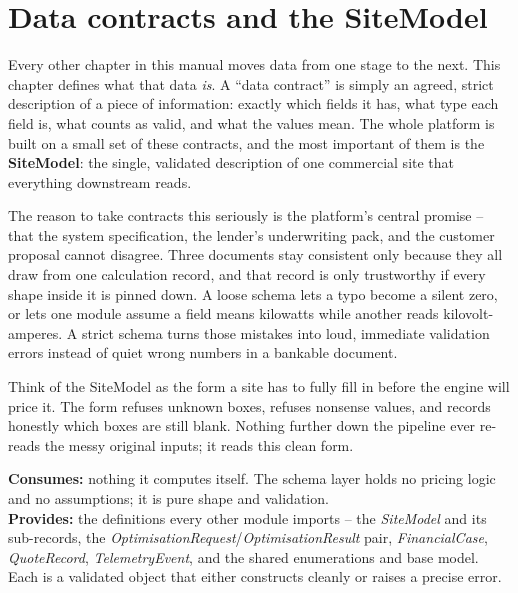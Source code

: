 \chapter{Data contracts and the SiteModel}
\label{ch:contracts}


Every other chapter in this manual moves data from one stage to the next. This chapter defines what that data \emph{is}. A ``data contract'' is simply an agreed, strict description of a piece of information: exactly which fields it has, what type each field is, what counts as valid, and what the values mean. The whole platform is built on a small set of these contracts, and the most important of them is the \textbf{SiteModel}: the single, validated description of one commercial site that everything downstream reads.

The reason to take contracts this seriously is the platform's central promise -- that the system specification, the lender's underwriting pack, and the customer proposal cannot disagree. Three documents stay consistent only because they all draw from one calculation record, and that record is only trustworthy if every shape inside it is pinned down. A loose schema lets a typo become a silent zero, or lets one module assume a field means kilowatts while another reads kilovolt-amperes. A strict schema turns those mistakes into loud, immediate validation errors instead of quiet wrong numbers in a bankable document.

\begin{plainnote}
Think of the SiteModel as the form a site has to fully fill in before the engine will price it. The form refuses unknown boxes, refuses nonsense values, and records honestly which boxes are still blank. Nothing further down the pipeline ever re-reads the messy original inputs; it reads this clean form.
\end{plainnote}


\begin{contract}
\textbf{Consumes:} nothing it computes itself. The schema layer holds no pricing logic and no assumptions; it is pure shape and validation.\\[2pt]
\textbf{Provides:} the definitions every other module imports -- the \emph{SiteModel} and its sub-records, the \emph{OptimisationRequest}/\emph{OptimisationResult} pair, \emph{FinancialCase}, \emph{QuoteRecord}, \emph{TelemetryEvent}, and the shared enumerations and base model. Each is a validated object that either constructs cleanly or raises a precise error.
\end{contract}

